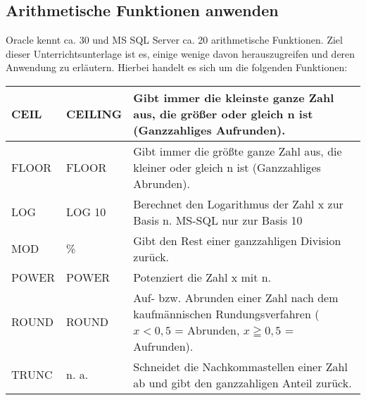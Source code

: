       \subsection{Arithmetische Funktionen anwenden}
        Oracle kennt ca. 30 und MS SQL Server ca. 20 arithmetische Funktionen.
        Ziel dieser Unterrichtsunterlage ist es, einige wenige davon
        herauszugreifen und deren Anwendung zu erläutern. Hierbei handelt es
        sich um die folgenden Funktionen:
        \begin{center}
          \label{srfarithmfct}
          \begin{small}
            \tabletail{
              \hline
            }
            \tablelasttail {
              \hline
            }
            \begin{supertabular}{|l|l|p{10cm}|}
              CEIL & CEILING & Gibt immer die kleinste ganze Zahl aus, die
              größer oder gleich n ist (Ganzzahliges Aufrunden).\\
              \hline
              FLOOR & FLOOR & Gibt immer die größte ganze Zahl aus, die
              kleiner oder gleich n ist (Ganzzahliges Abrunden). \\
              \hline
              LOG & LOG 10 & Berechnet den Logarithmus der Zahl x zur Basis n. MS-SQL nur zur Basis 10 \\
              \hline
              MOD & \% & Gibt den Rest einer ganzzahligen Division zurück. \\
              \hline
              POWER & POWER & Potenziert die Zahl x mit n. \\
              \hline
              ROUND & ROUND & Auf- bzw. Abrunden einer Zahl nach dem
              kaufmännischen Rundungsverfahren ($x < 0,5$ = Abrunden, $x \geqq
              0,5$ = Aufrunden). \\
              \hline
              TRUNC & n. a. & Schneidet die Nachkommastellen einer Zahl ab und
              gibt den ganzzahligen Anteil zurück. \\
            \end{supertabular}
          \end{small}
        \end{center}
